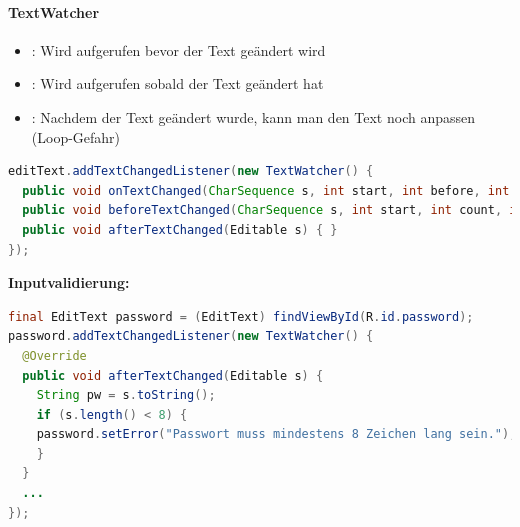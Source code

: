 \paragraph{TextWatcher}
\begin{itemize}
\item {}: Wird aufgerufen bevor der Text geändert wird
\item {}: Wird aufgerufen sobald der Text geändert hat
\item {}: Nachdem der Text geändert wurde, kann man den Text noch anpassen (Loop-Gefahr)
\end{itemize}
\begin{lstlisting}[language=java]
editText.addTextChangedListener(new TextWatcher() {
  public void onTextChanged(CharSequence s, int start, int before, int count){ }
  public void beforeTextChanged(CharSequence s, int start, int count, int after){ }
  public void afterTextChanged(Editable s) { }
});
\end{lstlisting}
\textbf{Inputvalidierung:}
\begin{lstlisting}[language=java]
final EditText password = (EditText) findViewById(R.id.password);
password.addTextChangedListener(new TextWatcher() {
  @Override
  public void afterTextChanged(Editable s) {
    String pw = s.toString();
    if (s.length() < 8) {
    password.setError("Passwort muss mindestens 8 Zeichen lang sein.");
    }
  }
  ...
});
\end{lstlisting}
